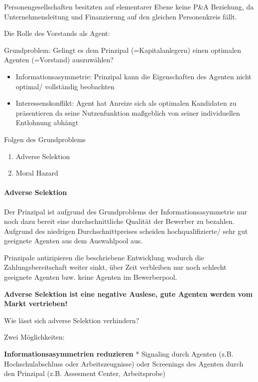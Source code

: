 \documentclass[
]{article}
\providecommand{\tightlist}{%
  \setlength{\itemsep}{0pt}\setlength{\parskip}{0pt}}
\begin{document}
Personengesellschaften besitzten auf elementarer Ebene keine P\&A
Beziehung, da Unternehmensleitung und Finanzierung auf den gleichen
Personenkreis fällt.

Die Rolle des Vorstands als Agent:

Grundproblem: Gelingt es dem Prinzipal (=Kapitalanlegern) einen
optimalen Agenten (=Vorstand) auszuwählen?

\begin{itemize}
\tightlist
\item
  Informationsasymmetrie: Prinzipal kann die Eigenschaften des Agenten
  nicht optimal/ vollständig beobachten
\item
  Interessenskonflikt: Agent hat Anreize sich als optimalen Kandidaten
  zu präsentieren da seine Nutzenfunktion maßgeblich von seiner
  individuellen Entlohnung abhängt
\end{itemize}

Folgen des Grundproblems

\begin{enumerate}
\def\labelenumi{\arabic{enumi}.}
\tightlist
\item
  Adverse Selektion
\item
  Moral Hazard
\end{enumerate}

\hypertarget{adverse-selektion}{%
\paragraph{Adverse Selektion}\label{adverse-selektion}}

Der Prinzipal ist aufgrund des Grundproblems der Informationsasymmetrie
nur noch dazu bereit eine durchschnittliche Qualität der Bewerber zu
bezahlen. Aufgrund des niedrigen Durchschnittpreises scheiden
hochqualifizierte/ sehr gut geeignete Agenten aus dem Auswahlpool aus.

Prinzipale antizipieren die beschriebene Entwicklung wodurch die
Zahlungsbereitschaft weiter sinkt, über Zeit verbleiben nur noch
schlecht geeignete Agenten bzw. keine Agenten im Bewerberpool.

\textbf{Adverse Selektion ist eine negative Auslese, gute Agenten werden
vom Markt vertrieben!}

Wie lässt sich adverse Selektion verhindern?

Zwei Möglichkeiten:

\textbf{Informationsasymmetrien reduzieren} * Signaling durch Agenten
(z.B. Hochschulabschluss oder Arbeitszeugnisse) oder Screenings des
Agenten durch den Prinzipal (z.B. Assesment Center, Arbeitsprobe)
\end{document}

